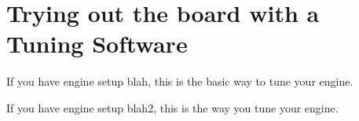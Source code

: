 \section{Trying out the board with a Tuning Software}

If you have engine setup blah, this is the basic way to tune your engine.

If you have engine setup blah2, this is the way you tune your engine.